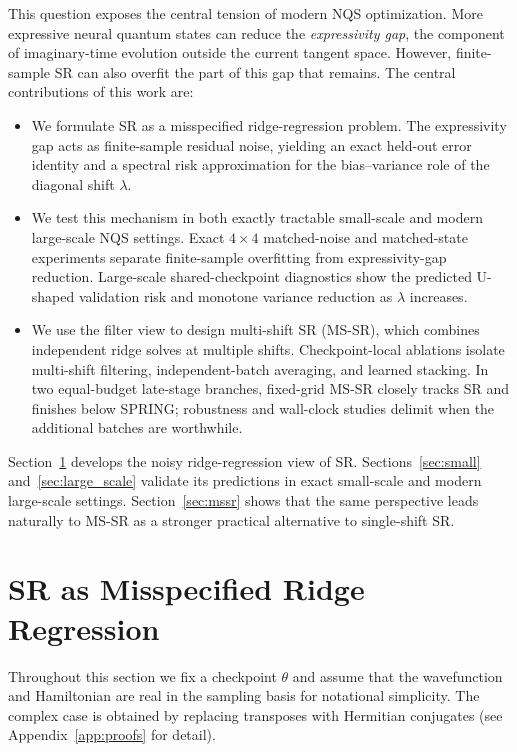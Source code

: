 \documentclass{article}
\begin{document}
This question exposes the central tension of modern NQS optimization. More expressive neural quantum states can reduce the \emph{expressivity gap}, the
component of imaginary-time evolution outside the current tangent space.
However, finite-sample SR can also overfit the part of this gap that remains.
The central contributions of this work are:

\begin{itemize}
    \item We formulate SR as a misspecified ridge-regression
    problem. The expressivity gap acts as finite-sample residual noise, yielding
    an exact held-out error identity and a spectral risk approximation for the
    bias--variance role of the diagonal shift \(\lambda\).

    \item We test this mechanism in both exactly tractable small-scale and modern
    large-scale NQS settings. Exact \(4\times4\) matched-noise and matched-state experiments
    separate finite-sample overfitting from expressivity-gap reduction.
    Large-scale shared-checkpoint diagnostics show the predicted U-shaped
    validation risk and monotone variance reduction as \(\lambda\) increases.

    \item We use the filter view to design multi-shift SR (MS-SR), which
    combines independent ridge solves at multiple shifts. Checkpoint-local
    ablations isolate multi-shift filtering, independent-batch averaging, and
    learned stacking. In two equal-budget late-stage branches, fixed-grid MS-SR
    closely tracks SR and finishes below SPRING; robustness and wall-clock
    studies delimit when the additional batches are worthwhile.

\end{itemize}

Section~\ref{sec:ridge} develops the noisy ridge-regression view of SR.
Sections~\ref{sec:small} and~\ref{sec:large_scale} validate its predictions in
exact small-scale and modern large-scale settings. Section~\ref{sec:mssr} shows
that the same perspective leads naturally to MS-SR as a stronger practical
alternative to single-shift SR.

\section{SR as Misspecified Ridge Regression}\label{sec:ridge}

Throughout this section we fix a checkpoint \(\theta\) and assume that the wavefunction and Hamiltonian are real in the
sampling basis for notational simplicity. The complex case is obtained by replacing transposes with
Hermitian conjugates (see Appendix~\ref{app:proofs} for detail).
\end{document}
